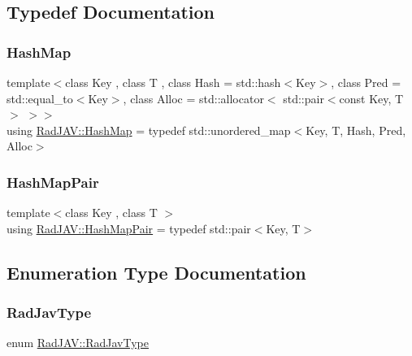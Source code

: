 \subsection{Typedef Documentation}
\mbox{\label{namespace_rad_j_a_v_a7c83af3095bdd8035fd71ff008120f08}} 
\subsubsection{\texorpdfstring{Hash\+Map}{HashMap}}
{\footnotesize\ttfamily template$<$class Key , class T , class Hash  = std\+::hash$<$\+Key$>$, class Pred  = std\+::equal\+\_\+to$<$\+Key$>$, class Alloc  = std\+::allocator$<$ std\+::pair$<$const Key, T$>$ $>$$>$ \\
using \mbox{\hyperlink{namespace_rad_j_a_v_a7c83af3095bdd8035fd71ff008120f08}{Rad\+J\+A\+V\+::\+Hash\+Map}} = typedef std\+::unordered\+\_\+map$<$Key, T, Hash, Pred, Alloc$>$}

\mbox{\label{namespace_rad_j_a_v_a30d60bf9d089b96b0114968b690c6a1f}} 
\subsubsection{\texorpdfstring{Hash\+Map\+Pair}{HashMapPair}}
{\footnotesize\ttfamily template$<$class Key , class T $>$ \\
using \mbox{\hyperlink{namespace_rad_j_a_v_a30d60bf9d089b96b0114968b690c6a1f}{Rad\+J\+A\+V\+::\+Hash\+Map\+Pair}} = typedef std\+::pair$<$Key, T$>$}



\subsection{Enumeration Type Documentation}
\mbox{\label{namespace_rad_j_a_v_a74e0b9a4c586a0346af4029e5a7e3d30}} 
\subsubsection{\texorpdfstring{Rad\+Jav\+Type}{RadJavType}}
{\footnotesize\ttfamily enum \mbox{\hyperlink{namespace_rad_j_a_v_a74e0b9a4c586a0346af4029e5a7e3d30}{Rad\+J\+A\+V\+::\+Rad\+Jav\+Type}}}

